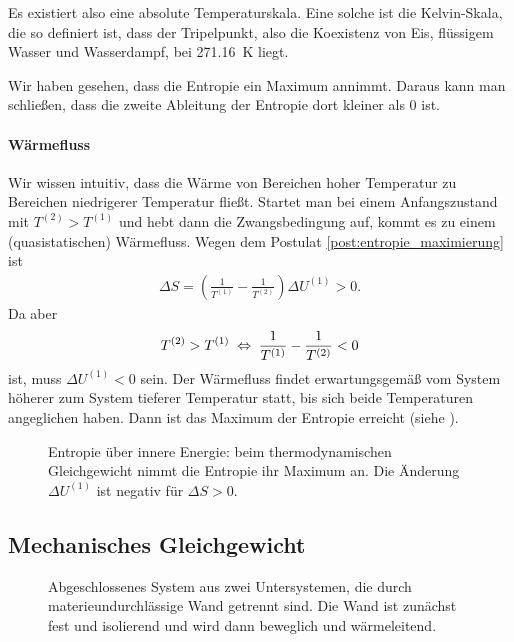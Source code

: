 Es existiert also eine absolute Temperaturskala. Eine solche ist die Kelvin-Skala, die so definiert ist, dass der Tripelpunkt, also die Koexistenz von Eis, flüssigem Wasser und Wasserdampf, bei \SI{271,16}{\kelvin} liegt. 

Wir haben gesehen, dass die Entropie ein Maximum annimmt. Daraus kann man schließen, dass die zweite Ableitung der Entropie dort kleiner als $0$ ist. 

\paragraph*{Wärmefluss}

Wir wissen intuitiv, dass die Wärme von Bereichen hoher Temperatur zu Bereichen niedrigerer Temperatur fließt. Startet man bei einem Anfangszustand mit $T^{(2)}> T^{(1)}$ und hebt dann die Zwangsbedingung auf, kommt es zu einem (quasistatischen) Wärmefluss. 
Wegen dem Postulat \ref{post:entropie_maximierung} ist 
\begin{align*}
    \Delta S= \left(\frac{1}{T^{(1)}}-\frac{1}{T^{(2)}}\right)\Delta U^{(1)} > 0. 
\end{align*}
Da aber 
\begin{align*}
    T^{(2)}> T^{(1)} \;\Leftrightarrow\; \frac{1}{T^{(1)}}-\frac{1}{T^{(2)}} < 0
\end{align*}
ist, muss $\Delta U^{(1)} <0$ sein. Der Wärmefluss findet erwartungsgemäß vom System höherer zum System tieferer Temperatur statt, bis sich beide Temperaturen angeglichen haben. Dann ist das Maximum der Entropie erreicht (siehe ). 

\begin{figure}[htbp]
    \centering
    \tfigFunktionEntropieMaximum
    \caption{Entropie über innere Energie: beim thermodynamischen Gleichgewicht nimmt die Entropie ihr Maximum an. Die Änderung $\Delta U^{(1)}$ ist negativ für $\Delta S>0$. }
    \label{fig:FunktionEntropieMaximum}
\end{figure}

\subsection{Mechanisches Gleichgewicht}


\begin{figure}[htbp]
    \centering
    \tfigDoppelsystemUVNbeweglicheIsolierendeWand
    \caption{Abgeschlossenes System aus zwei Untersystemen, die durch materieundurchlässige Wand getrennt sind. Die Wand ist zunächst fest und isolierend und wird dann beweglich und wärmeleitend.}
    \label{fig:DoppelsystemUVNbeweglicheIsolierendeWand}
\end{figure}